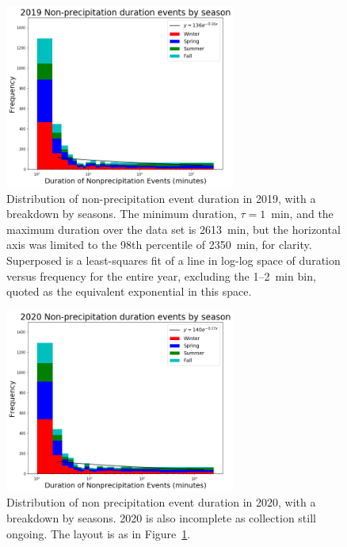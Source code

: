 \documentclass[11pt]{report}
\begin{document}
\clearpage
\begin{figure}[t]
	\centering
	\includegraphics[width=0.675\textwidth]{Figures/nonprecip_2019.png}
	\caption[Histogram of non-precipitation events for 2019 broken
          down by season]{\label{np2019} Distribution of
          non-precipitation event duration in 2019, with a breakdown
          by seasons. The minimum duration, $\tau=1$~min, and the
          maximum duration over the data set is 2613~min, but the
          horizontal axis was limited to the 98th percentile of
          2350~min, for clarity. Superposed is a least-squares fit of
          a line in log-log space of duration versus frequency for the
          entire year, excluding the 1--2~min bin, quoted as the
          equivalent exponential in this space.}
\end{figure}
\begin{figure}[b]
	\centering
	\includegraphics[width=0.675\textwidth]{Figures/nonprecip_2020.png}
	\caption[Histogram of non-precipitation events for 2020 broken down by
	season]{\label{np2020} Distribution of non precipitation event duration
		in 2020, with a breakdown by seasons. 2020 is also
		incomplete as collection still ongoing. The layout is as in
		Figure~\ref{np2019}.}
\end{figure}
\end{document}
